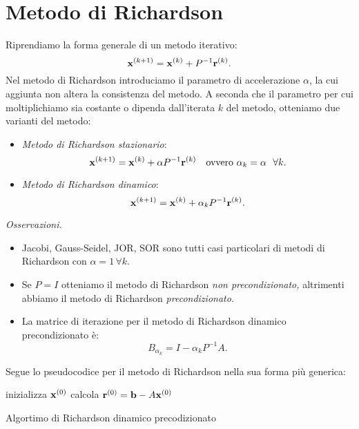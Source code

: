 \section{Metodo di Richardson}
Riprendiamo la forma generale di un metodo iterativo:
\begin{equation*}
\mathbf{x}^{( k+1)} =\mathbf{x}^{(k)} +P^{-1}\mathbf{r}^{(k)}.
\end{equation*}
Nel metodo di Richardson introduciamo il parametro di accelerazione $\alpha $, la cui aggiunta non altera la consistenza del metodo.
A seconda che il parametro per cui moltiplichiamo sia costante o dipenda dall'iterata $k$ del metodo, otteniamo due varianti del metodo:
\begin{itemize}
\item \textit{Metodo di Richardson stazionario}:
\begin{equation*}
\x^{( k+1)} =\x^{(k)} +\alpha P^{-1}\mathbf{r}^{(k)} \quad \text{ovvero } \alpha _{k} =\alpha \ \ \forall k.
\end{equation*}
\item \textit{Metodo di Richardson dinamico}:
\begin{equation*}
\mathbf{x}^{( k+1)} =\mathbf{x}^{(k)} +\alpha _{k} P^{-1}\mathbf{r}^{(k)}.
\end{equation*}
\end{itemize}
\textit{Osservazioni.}
\begin{itemize}
\item Jacobi, Gauss-Seidel, JOR, SOR sono tutti casi particolari di metodi di Richardson con $\alpha =1 \, \forall k$.
\item Se $P=I$ otteniamo il metodo di Richardson \textit{non precondizionato,} altrimenti abbiamo il metodo di Richardson \textit{precondizionato.}
\item La matrice di iterazione per il metodo di Richardson dinamico precondizionato è:
\begin{equation*}
B_{\alpha _{k}} =I-\alpha _{k} P^{-1} A.
\end{equation*}
\end{itemize}
Segue lo pseudocodice per il metodo di Richardson nella sua forma più generica: \\
\begin{algo}
	inizializza $\mathbf{x}^{(0)}$\;
	calcola $\mathbf{r}^{(0)} =\mathbf{b} -A\mathbf{x}^{(0)}$\;
	\caption{Algortimo di Richardson dinamico precodizionato}
\end{algo}
